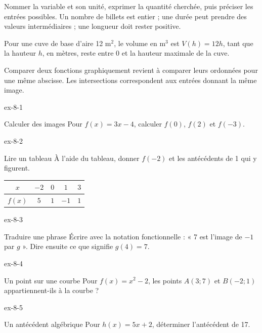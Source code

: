 \begin{savoirfaire}[Modéliser]Nommer la variable et son unité, exprimer la quantité cherchée, puis préciser les entrées possibles. Un nombre de billets est entier ; une durée peut prendre des valeurs intermédiaires ; une longueur doit rester positive.\end{savoirfaire}
\begin{exemple}Pour une cuve de base d’aire 12 m$^2$, le volume en m$^3$ est $V(h)=12h$, tant que la hauteur $h$, en mètres, reste entre 0 et la hauteur maximale de la cuve.\end{exemple}
\begin{propriete}Comparer deux fonctions graphiquement revient à comparer leurs ordonnées pour une même abscisse. Les intersections correspondent aux entrées donnant la même image.\end{propriete}
\clearpage{}
\begin{blocLivre}{ex-8-1}\begin{exercice}[1]{Calculer des images}
Pour $f(x)=3x-4$, calculer $f(0)$, $f(2)$ et $f(-3)$.
\end{exercice}\end{blocLivre}
\begin{blocLivre}{ex-8-2}\begin{exercice}[1]{Lire un tableau}
À l’aide du tableau, donner $f(-2)$ et les antécédents de 1 qui y figurent.\begin{center}\renewcommand{\arraystretch}{1.35}\begin{tabular}{c|cccc}\toprule
$x$ & $-2$ & $0$ & $1$ & $3$\\\midrule
$f(x)$ & $5$ & $1$ & $-1$ & $1$\\
\bottomrule\end{tabular}\end{center}
\end{exercice}\end{blocLivre}
\begin{blocLivre}{ex-8-3}\begin{exercice}[1]{Traduire une phrase}
Écrire avec la notation fonctionnelle : « 7 est l’image de $-1$ par $g$ ». Dire ensuite ce que signifie $g(4)=7$.
\end{exercice}\end{blocLivre}
\begin{blocLivre}{ex-8-4}\begin{exercice}[1]{Un point sur une courbe}
Pour $f(x)=x^2-2$, les points $A(3;7)$ et $B(-2;1)$ appartiennent-ils à la courbe ?
\end{exercice}\end{blocLivre}
\begin{blocLivre}{ex-8-5}\begin{exercice}[1]{Un antécédent algébrique}
Pour $h(x)=5x+2$, déterminer l’antécédent de 17.
\end{exercice}\end{blocLivre}

